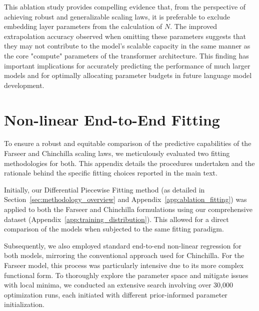 \documentclass{article}
\begin{document}
This ablation study provides compelling evidence that, from the perspective of achieving robust and generalizable scaling laws, it is preferable to exclude embedding layer parameters from the calculation of $N$. The improved extrapolation accuracy observed when omitting these parameters suggests that they may not contribute to the model's scalable capacity in the same manner as the core "compute" parameters of the transformer architecture. This finding has important implications for accurately predicting the performance of much larger models and for optimally allocating parameter budgets in future language model development.


\FloatBarrier

\section{Non-linear End-to-End Fitting}
\label{app:nonlinear_fitting}

To ensure a robust and equitable comparison of the predictive capabilities of the Farseer and Chinchilla scaling laws, we meticulously evaluated two fitting methodologies for both. This appendix details the procedures undertaken and the rationale behind the specific fitting choices reported in the main text.

Initially, our Differential Piecewise Fitting method (as detailed in Section~\ref{sec:methodology_overview} and Appendix~\ref{app:ablation_fitting}) was applied to both the Farseer and Chinchilla formulations using our comprehensive dataset (Appendix~\ref{app:training_distribution}). This allowed for a direct comparison of the models when subjected to the same fitting paradigm.

Subsequently, we also employed standard end-to-end non-linear regression for both models, mirroring the conventional approach used for Chinchilla. For the Farseer model, this process was particularly intensive due to its more complex functional form. To thoroughly explore the parameter space and mitigate issues with local minima, we conducted an extensive search involving over 30,000 optimization runs, each initiated with different prior-informed parameter initialization.

\end{document}
